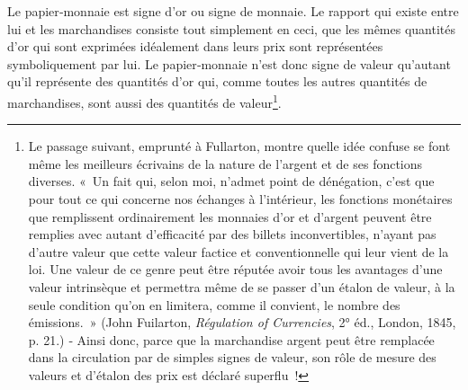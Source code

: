 \documentclass[french,twoside]{book} %
\begin{document}
Le papier‑monnaie est signe d’or ou signe de monnaie. Le rapport qui existe entre lui et les marchandises consiste tout simplement en ceci, que les mêmes quantités d’or qui sont exprimées idéalement dans leurs prix sont représentées symboliquement par lui. Le papier‑monnaie n’est donc signe de valeur qu’autant qu’il représente des quantités d’or qui, comme toutes les autres quantités de marchandises, sont aussi des quantités de valeur\footnote{Le passage suivant, emprunté à Fullarton, montre quelle idée confuse se font même les meilleurs écrivains de la nature de l’argent et de ses fonctions diverses. « Un fait qui, selon moi, n’admet point de dénégation, c’est que pour tout ce qui concerne nos échanges à l’intérieur, les fonctions monétaires que remplissent ordinairement les monnaies d’or et d’argent peuvent être remplies avec autant d’efficacité par des billets inconvertibles, n’ayant pas d’autre valeur que cette valeur factice et conventionnelle qui leur vient de la loi. Une valeur de ce genre peut être réputée avoir tous les avantages d’une valeur intrinsèque et permettra même de se passer d’un étalon de valeur, à la seule condition qu’on en limitera, comme il convient, le nombre des émissions. » (John Fuilarton, \emph{Régulation of Currencies}, 2° éd., London, 1845, p. 21.) ‑ Ainsi donc, parce que la marchandise argent peut être remplacée dans la circulation par de simples signes de valeur, son rôle de mesure des valeurs et d’étalon des prix est déclaré superflu !}.\par
\end{document}

